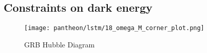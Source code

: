 \subsection{Constraints on dark energy}
\begin{figure}[h]
	\centering
	\texttt{[image: pantheon/lstm/18\_omega\_M\_corner\_plot.png]}
	\caption{GRB Hubble Diagram}
	\label{fig:OmegaM_lstm}
\end{figure}